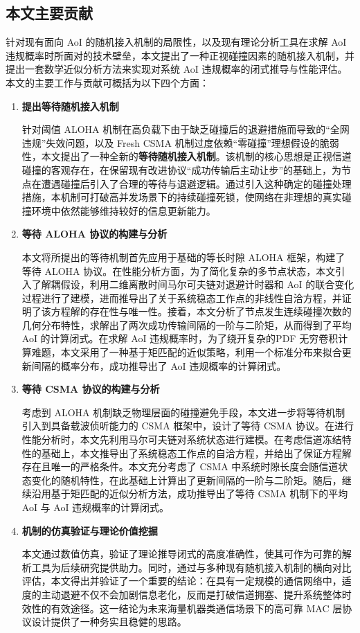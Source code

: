 \subsection{本文主要贡献}
针对现有面向 AoI 的随机接入机制的局限性，以及现有理论分析工具在求解 AoI 违规概率时所面对的技术壁垒，本文提出了一种正视碰撞因素的随机接入机制，并提出一套数学近似分析方法来实现对系统 AoI 违规概率的闭式推导与性能评估。本文的主要工作与贡献可概括为以下四个方面：
\begin{enumerate}[wide]
\item \textbf{提出等待随机接入机制}

针对阈值 ALOHA 机制在高负载下由于缺乏碰撞后的退避措施而导致的“全网违规”失效问题，以及 Fresh CSMA 机制过度依赖“零碰撞”理想假设的脆弱性，本文提出了一种全新的\textbf{等待随机接入机制}。该机制的核心思想是正视信道碰撞的客观存在，在保留现有改进协议“成功传输后主动让步”的基础上，为节点在遭遇碰撞后引入了合理的等待与退避逻辑。通过引入这种确定的碰撞处理措施，本机制可打破高并发场景下的持续碰撞死锁，使网络在非理想的真实碰撞环境中依然能够维持较好的信息更新能力。

\item \textbf{等待 ALOHA 协议的构建与分析}

本文将所提出的等待机制首先应用于基础的等长时隙 ALOHA 框架，构建了等待 ALOHA 协议。在性能分析方面，为了简化复杂的多节点状态，本文引入了解耦假设，利用二维离散时间马尔可夫链对退避计时器和 AoI 的联合变化过程进行了建模，进而推导出了关于系统稳态工作点的非线性自洽方程，并证明了该方程解的存在性与唯一性。接着，本文分析了节点发生连续碰撞次数的几何分布特性，求解出了两次成功传输间隔的一阶与二阶矩，从而得到了平均 AoI 的计算闭式。在求解 AoI 违规概率时，为了绕开复杂的PDF 无穷卷积计算难题，本文采用了一种基于矩匹配的近似策略，利用一个标准分布来拟合更新间隔的概率分布，成功推导出了 AoI 违规概率的计算闭式。

\item \textbf{等待 CSMA 协议的构建与分析}

考虑到 ALOHA 机制缺乏物理层面的碰撞避免手段，本文进一步将等待机制引入到具备载波侦听能力的 CSMA 框架中，设计了等待 CSMA 协议。在进行性能分析时，本文先利用马尔可夫链对系统状态进行建模。在考虑信道冻结特性的基础上，本文推导出了系统稳态工作点的自洽方程，并给出了保证方程解存在且唯一的严格条件。本文充分考虑了 CSMA 中系统时隙长度会随信道状态变化的随机特性，在此基础上计算出了更新间隔的一阶与二阶矩。随后，继续沿用基于矩匹配的近似分析方法，成功推导出了等待 CSMA 机制下的平均 AoI 与 AoI 违规概率的计算闭式。

\item \textbf{机制的仿真验证与理论价值挖掘}

本文通过数值仿真，验证了理论推导闭式的高度准确性，使其可作为可靠的解析工具为后续研究提供助力。同时，通过与多种现有随机接入机制的横向对比评估，本文得出并验证了一个重要的结论：在具有一定规模的通信网络中，适度的主动退避不仅不会加剧信息老化，反而是打破信道拥塞、提升系统整体时效性的有效途径。这一结论为未来海量机器类通信场景下的高可靠 MAC 层协议设计提供了一种务实且稳健的思路。
\end{enumerate}
	
